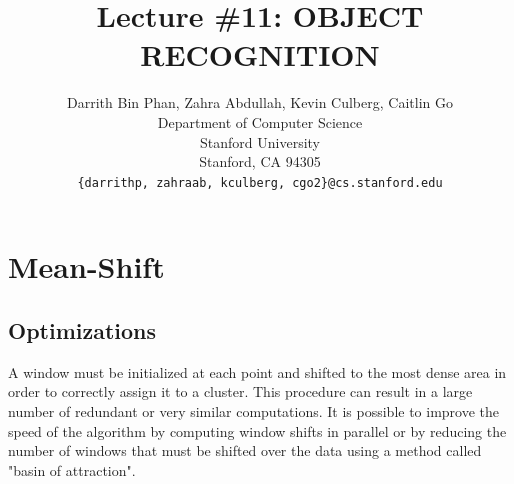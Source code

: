 \documentclass{article}
\title{Lecture \#11: OBJECT RECOGNITION}
\author{
  Darrith Bin Phan, Zahra Abdullah, Kevin Culberg, Caitlin Go \\
  Department of Computer Science\\
  Stanford University\\
  Stanford, CA 94305 \\
  \texttt{\{darrithp, zahraab, kculberg, cgo2\}@cs.stanford.edu} \\
}
\begin{document}
\maketitle

\section{Mean-Shift}

\subsection{Optimizations}

A window must be initialized at each point and shifted to the most dense area in order to correctly assign it to a cluster. This procedure can result in a large number of redundant or very similar computations. It is possible to improve the speed of the algorithm by computing window shifts in parallel or by reducing the number of windows that must be shifted over the data using a method called "basin of attraction".
\end{document}
